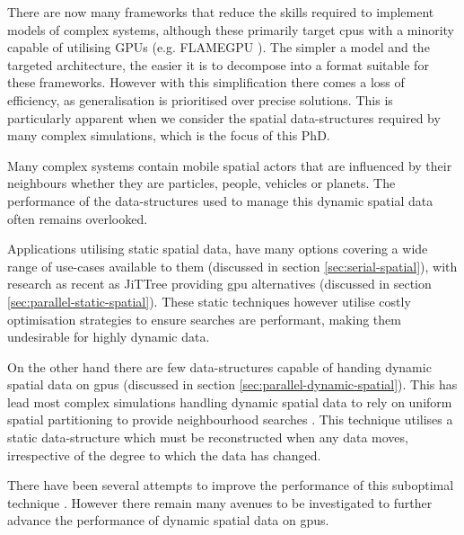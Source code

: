   There are now many frameworks that reduce the skills required to implement models of complex systems, although these primarily target \glspl{cpu} with a minority capable of utilising GPUs (e.g. FLAMEGPU \cite{RR11}). The simpler a model and the targeted architecture, the easier it is to decompose into a format suitable for these frameworks. However with this simplification there comes a loss of efficiency, as generalisation is prioritised over precise solutions. This is particularly apparent when we consider the spatial data-structures required by many complex simulations, which is the focus of this PhD.
  
  Many complex systems contain mobile spatial actors that are influenced by their neighbours whether they are particles, people, vehicles or planets. The performance of the data-structures used to manage this dynamic spatial data often remains overlooked.
  
  Applications utilising static spatial data, have many options covering a wide range of use-cases available to them \cite{FB74,Mea80,FKN80,Gut84,SRF87} (discussed in section \ref{sec:serial-spatial}), with research as recent as JiTTree providing \gls{gpu} alternatives \cite{LB*16} (discussed in section \ref{sec:parallel-static-spatial}). These static techniques however utilise costly optimisation strategies to ensure searches are performant, making them undesirable for highly dynamic data. 
  
  On the other hand there are few data-structures capable of handing dynamic spatial data on \glspl{gpu} (discussed in section \ref{sec:parallel-dynamic-spatial}). This has lead most complex simulations handling dynamic spatial data to rely on uniform spatial partitioning to provide neighbourhood searches \cite{GS*10}. This technique utilises a static data-structure which must be reconstructed when any data moves, irrespective of the degree to which the data has changed.
  
  There have been several attempts to improve the performance of this suboptimal technique \cite{GS*10,HY*15,JR*15}. However there remain many avenues to be investigated to further advance the performance of dynamic spatial data on \glspl{gpu}.
  
